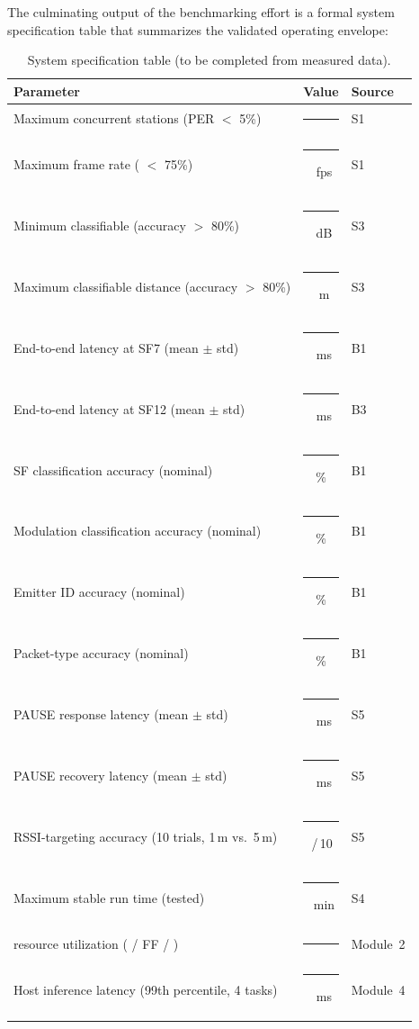 \documentclass[11pt,letterpaper]{article}
\begin{document}
	The culminating output of the benchmarking effort is a formal system specification table that summarizes the validated operating envelope:

	\begin{table}[ht!]
		\centering
		\caption{System specification table (to be completed from measured data).}
		\label{tab:spec}
		\renewcommand{\arraystretch}{1.3}
		\begin{tabularx}{\textwidth}{X c l}
			\toprule
			\textbf{Parameter} & \textbf{Value} & \textbf{Source} \\
			\midrule
			Maximum concurrent stations (PER $<$ 5\%) & \rule{1.5cm}{0.4pt} & S1 \\
			Maximum frame rate (\FIFO{} $<$ 75\%) & \rule{1.5cm}{0.4pt}~fps & S1 \\
			Minimum classifiable \SNR{} (accuracy $>$ 80\%) & \rule{1.5cm}{0.4pt}~dB & S3 \\
			Maximum classifiable distance (accuracy $>$ 80\%) & \rule{1.5cm}{0.4pt}~m & S3 \\
			End-to-end latency at SF7 (mean $\pm$ std) & \rule{1.5cm}{0.4pt}~ms & B1 \\
			End-to-end latency at SF12 (mean $\pm$ std) & \rule{1.5cm}{0.4pt}~ms & B3 \\
			SF classification accuracy (nominal) & \rule{1.5cm}{0.4pt}\% & B1 \\
			Modulation classification accuracy (nominal) & \rule{1.5cm}{0.4pt}\% & B1 \\
			Emitter ID accuracy (nominal) & \rule{1.5cm}{0.4pt}\% & B1 \\
			Packet-type accuracy (nominal) & \rule{1.5cm}{0.4pt}\% & B1 \\
			PAUSE response latency (mean $\pm$ std) & \rule{1.5cm}{0.4pt}~ms & S5 \\
			PAUSE recovery latency (mean $\pm$ std) & \rule{1.5cm}{0.4pt}~ms & S5 \\
			RSSI-targeting accuracy (10 trials, 1\,m vs.\ 5\,m) & \rule{1.5cm}{0.4pt}\,/\,10 & S5 \\
			Maximum stable run time (tested) & \rule{1.5cm}{0.4pt}~min & S4 \\
			\FPGA{} resource utilization (\LUT{} / FF / \BRAM{}) & \rule{1.5cm}{0.4pt} & Module~2 \\
			Host inference latency (99th percentile, 4 tasks) & \rule{1.5cm}{0.4pt}~ms & Module~4 \\
			\bottomrule
		\end{tabularx}
	\end{table}
\end{document}

